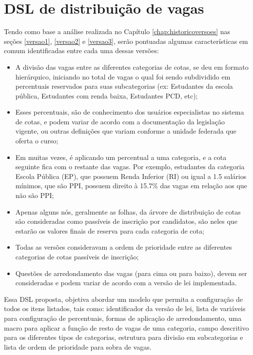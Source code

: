 \section{DSL de distribuição de vagas}
\label{sec:dslproposta:usuario}

   
 Tendo como base a análise realizada no Capítulo \ref{chap:historicoversoes} nas seções \ref{versao1}, \ref{versao2} e \ref{versao3}, serão pontuadas algumas características em comum identificadas entre cada uma dessas versões:
   
   \begin{itemize}
    \item A divisão das vagas entre as diferentes categorias de cotas, se deu em formato hierárquico, iniciando no total de vagas o qual foi sendo subdividido em percentuais reservados para suas subcategorias (ex: Estudantes da escola pública, Estudantes com renda baixa, Estudantes PCD, etc); 
   
   \item Esses percentuais, são de conhecimento dos usuários especialistas no sistema de cotas, e podem variar de acordo com a documentação da legislação vigente, ou outras definições que variam conforme a unidade federada que oferta o curso; 
   
   \item Em muitas vezes, é aplicando um percentual a uma categoria, e a cota seguinte fica com o restante das vagas. Por exemplo, estudantes da categoria Escola Pública (EP), que possuem Renda Inferior (RI) ou igual a 1.5 salários mínimos, que são \gls{PPI}, possuem direito à 15.7\% das vagas em relação aos que não são \gls{PPI};
   
   \item Apenas alguns nós, geralmente as folhas, da árvore de distribuição de cotas são consideradas como passíveis de inscrição por candidatos, são neles que estarão os valores finais de reserva para cada categoria de cota;
   
   \item Todas as versões consideravam a ordem de prioridade entre as diferentes categorias de cotas passíveis de inscrição;
   
   \item Questões de arredondamento das vagas (para cima ou para baixo), devem ser consideradas e podem variar de acordo com a versão de lei implementada.

   \end{itemize}
   
   Essa \gls{DSL} proposta, objetiva abordar um modelo que permita a configuração de todos os itens listados, tais como: identificador da versão de lei, lista de variáveis para configuração de percentuais, formas de aplicação de arredondamento, uma macro para aplicar a função de resto de vagas de uma categoria, campo descritivo para os diferentes tipos de categorias, estrutura para divisão em subcategorias e lista de ordem de prioridade para sobra de vagas.
   
